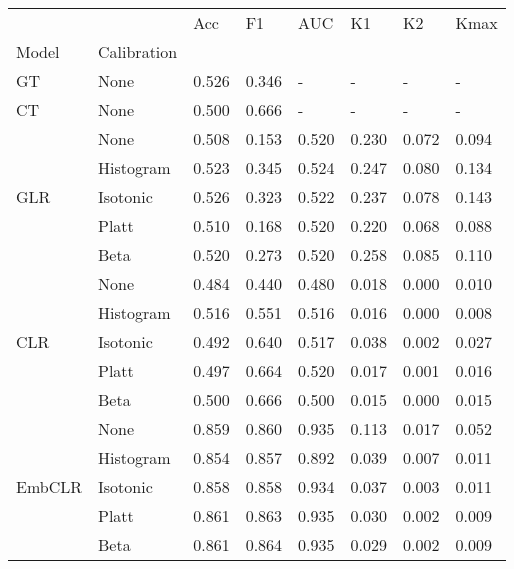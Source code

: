 \begin{tabular}{llllllll}
\toprule
 &  & Acc & F1 & AUC & K1 & K2 & Kmax \\
Model & Calibration &  &  &  &  &  &  \\
\midrule
GT & None & 0.526 & 0.346 & - & - & - & - \\
\cline{1-8}
CT & None & 0.500 & 0.666 & - & - & - & - \\
\cline{1-8}
\multirow[t]{5}{*}{GLR} & None & 0.508 & 0.153 & 0.520 & 0.230 & 0.072 & 0.094 \\
 & Histogram & 0.523 & 0.345 & 0.524 & 0.247 & 0.080 & 0.134 \\
 & Isotonic & 0.526 & 0.323 & 0.522 & 0.237 & 0.078 & 0.143 \\
 & Platt & 0.510 & 0.168 & 0.520 & 0.220 & 0.068 & 0.088 \\
 & Beta & 0.520 & 0.273 & 0.520 & 0.258 & 0.085 & 0.110 \\
\cline{1-8}
\multirow[t]{5}{*}{CLR} & None & 0.484 & 0.440 & 0.480 & 0.018 & 0.000 & 0.010 \\
 & Histogram & 0.516 & 0.551 & 0.516 & 0.016 & 0.000 & 0.008 \\
 & Isotonic & 0.492 & 0.640 & 0.517 & 0.038 & 0.002 & 0.027 \\
 & Platt & 0.497 & 0.664 & 0.520 & 0.017 & 0.001 & 0.016 \\
 & Beta & 0.500 & 0.666 & 0.500 & 0.015 & 0.000 & 0.015 \\
\cline{1-8}
\multirow[t]{5}{*}{EmbCLR} & None & 0.859 & 0.860 & 0.935 & 0.113 & 0.017 & 0.052 \\
 & Histogram & 0.854 & 0.857 & 0.892 & 0.039 & 0.007 & 0.011 \\
 & Isotonic & 0.858 & 0.858 & 0.934 & 0.037 & 0.003 & 0.011 \\
 & Platt & 0.861 & 0.863 & 0.935 & 0.030 & 0.002 & 0.009 \\
 & Beta & 0.861 & 0.864 & 0.935 & 0.029 & 0.002 & 0.009 \\
\cline{1-8}
\bottomrule
\end{tabular}
